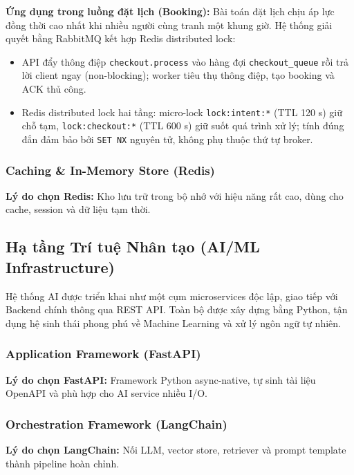 \noindent\textbf{Ứng dụng trong luồng đặt lịch (Booking):} Bài toán đặt lịch chịu áp lực đồng thời cao nhất khi nhiều người cùng tranh một khung giờ. Hệ thống giải quyết bằng RabbitMQ kết hợp Redis distributed lock:
\begin{itemize}
    \item API đẩy thông điệp \texttt{checkout.process} vào hàng đợi \texttt{checkout\_queue} rồi trả lời client ngay (non-blocking); worker tiêu thụ thông điệp, tạo booking và ACK thủ công.
    \item Redis distributed lock hai tầng: micro-lock \texttt{lock:intent:*} (TTL 120 s) giữ chỗ tạm, \texttt{lock:checkout:*} (TTL 600 s) giữ suốt quá trình xử lý; tính đúng đắn đảm bảo bởi \texttt{SET NX} nguyên tử, không phụ thuộc thứ tự broker.
\end{itemize}


\subsubsection{Caching \& In-Memory Store (Redis)}
\noindent\textbf{Lý do chọn Redis:} Kho lưu trữ trong bộ nhớ với hiệu năng rất cao, dùng cho cache, session và dữ liệu tạm thời.


\subsection{Hạ tầng Trí tuệ Nhân tạo (AI/ML Infrastructure)}

Hệ thống AI được triển khai như một cụm microservices độc lập, giao tiếp với Backend chính thông qua REST API. Toàn bộ được xây dựng bằng Python, tận dụng hệ sinh thái phong phú về Machine Learning và xử lý ngôn ngữ tự nhiên.

\subsubsection{Application Framework (FastAPI)}
\noindent\textbf{Lý do chọn FastAPI:} Framework Python async-native, tự sinh tài liệu OpenAPI và phù hợp cho AI service nhiều I/O.

\subsubsection{Orchestration Framework (LangChain)}
\noindent\textbf{Lý do chọn LangChain:} Nối LLM, vector store, retriever và prompt template thành pipeline hoàn chỉnh.

